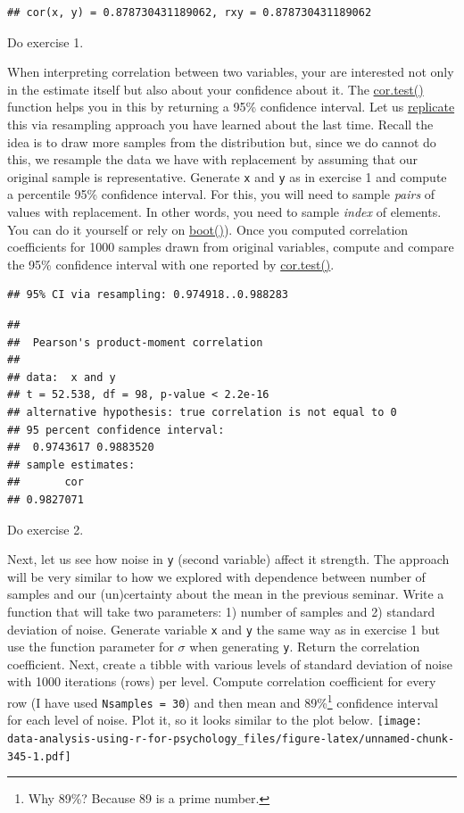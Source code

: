 \documentclass[
]{book}
\begin{document}
\begin{verbatim}
## cor(x, y) = 0.878730431189062, rxy = 0.878730431189062
\end{verbatim}

Do exercise 1.

When interpreting correlation between two variables, your are interested not only in the estimate itself but also about your confidence about it. The \href{https://stat.ethz.ch/R-manual/R-devel/library/stats/html/cor.test.html}{cor.test()} function helps you in this by returning a 95\% confidence interval. Let us \href{https://stat.ethz.ch/R-manual/R-devel/library/base/html/lapply.html}{replicate} this via resampling approach you have learned about the last time. Recall the idea is to draw more samples from the distribution but, since we do cannot do this, we resample the data we have with replacement by assuming that our original sample is representative. Generate \texttt{x} and \texttt{y} as in exercise 1 and compute a percentile 95\% confidence interval. For this, you will need to sample \emph{pairs} of values with replacement. In other words, you need to sample \emph{index} of elements. You can do it yourself or rely on \href{https://stat.ethz.ch/R-manual/R-devel/library/boot/html/boot.html}{boot()}). Once you computed correlation coefficients for 1000 samples drawn from original variables, compute and compare the 95\% confidence interval with one reported by \href{https://stat.ethz.ch/R-manual/R-devel/library/stats/html/cor.test.html}{cor.test()}.

\begin{verbatim}
## 95% CI via resampling: 0.974918..0.988283
\end{verbatim}

\begin{verbatim}
## 
##  Pearson's product-moment correlation
## 
## data:  x and y
## t = 52.538, df = 98, p-value < 2.2e-16
## alternative hypothesis: true correlation is not equal to 0
## 95 percent confidence interval:
##  0.9743617 0.9883520
## sample estimates:
##       cor 
## 0.9827071
\end{verbatim}

Do exercise 2.

Next, let us see how noise in \texttt{y} (second variable) affect it strength. The approach will be very similar to how we explored with dependence between number of samples and our (un)certainty about the mean in the previous seminar. Write a function that will take two parameters: 1) number of samples and 2) standard deviation of noise. Generate variable \texttt{x} and \texttt{y} the same way as in exercise 1 but use the function parameter for \(\sigma\) when generating \texttt{y}. Return the correlation coefficient. Next, create a tibble with various levels of standard deviation of noise with 1000 iterations (rows) per level. Compute correlation coefficient for every row (I have used \texttt{Nsamples\ =\ 30}) and then mean and 89\%\footnote{Why 89\%? Because 89 is a prime number.} confidence interval for each level of noise. Plot it, so it looks similar to the plot below.
\texttt{[image: data-analysis-using-r-for-psychology\_files/figure-latex/unnamed-chunk-345-1.pdf]}
\end{document}
